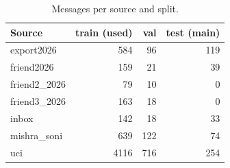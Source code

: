 \begin{table}[t]
\centering
\caption{Messages per source and split.}
\label{tab:sources}
\small
\begin{tabular}{lrrr}
\toprule
Source & train (used) & val & test (main) \\
\midrule
export2026 & 584 & 96 & 119 \\
friend2026 & 159 & 21 & 39 \\
friend2_2026 & 79 & 10 & 0 \\
friend3_2026 & 163 & 18 & 0 \\
inbox & 142 & 18 & 33 \\
mishra_soni & 639 & 122 & 74 \\
uci & 4116 & 716 & 254 \\
\bottomrule
\end{tabular}
\end{table}
